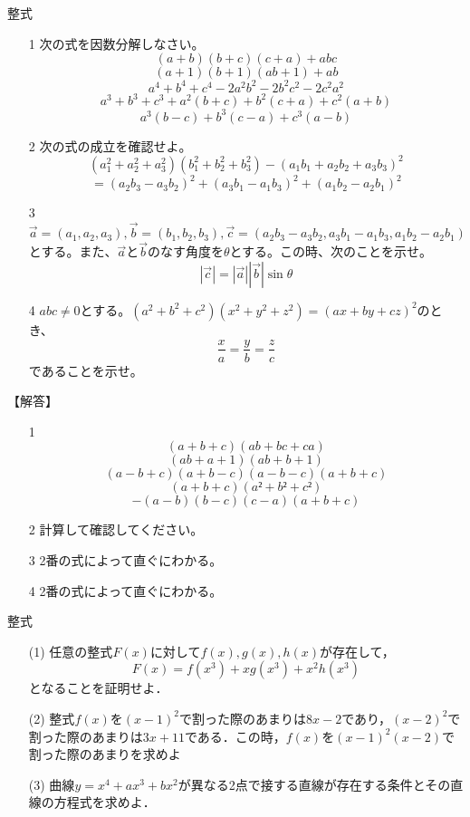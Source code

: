 \documentclass[a4paper,fleqn,dvipdfmx]{jsarticle}
\begin{document}
\newpage
\begin{itembox}[l]{整式}
    \begin{itemize}
        \item [1]
        次の式を因数分解しなさい。
        $$(a+b)(b+c)(c+a)+abc$$
        $$(a+1)(b+1)(ab+1)+ab$$
        $$a^4+b^4+c^4-2a^2b^2-2b^2c^2-2c^2a^2$$
        $$a^3+b^3+c^3+a^2(b+c)+b^2(c+a)+c^2(a+b)$$
        $$a^3(b-c)+b^3(c-a)+c^3(a-b)$$
        \item [2]
        次の式の成立を確認せよ。
        $$(a_1^2+a_2^2+a_3^2)(b_1^2+b_2^2+b_3^2)-(a_1b_1+a_2b_2+a_3b_3)^2$$
        $$=(a_2b_3-a_3b_2)^2+(a_3b_1-a_1b_3)^2+(a_1b_2-a_2b_1)^2$$
        \item [3] 
        $\overrightarrow{a}=(a_1,a_2,a_3),\overrightarrow{b}=(b_1,b_2,b_3),\overrightarrow{c}=(a_2b_3-a_3b_2,a_3b_1-a_1b_3,a_1b_2-a_2b_1)$とする。また、$\overrightarrow{a}$と$\overrightarrow{b}$のなす角度を$\theta$とする。この時、次のことを示せ。
        $$|\overrightarrow{c}|=|\overrightarrow{a}||\overrightarrow{b}|\sin\theta$$
        \item [4]
        $abc\neq 0$とする。$(a^2+b^2+c^2)(x^2+y^2+z^2)=(ax+by+cz)^2$のとき、$$\frac{x}{a}=\frac{y}{b}=\frac{z}{c}$$
        であることを示せ。
    \end{itemize}
\end{itembox}

\begin{flushleft}
【解答】\dotfill
\end{flushleft}

\begin{itemize}
    \item [1]$$(a+b+c)(ab+bc+ca)$$
    $$(ab+a+1)(ab+b+1)$$
    $$(a-b+c)(a+b-c)(a-b-c)(a+b+c)$$
    $$(a+b+c)(a²+b²+c²)$$
    $$-(a-b)(b-c)(c-a)(a+b+c)$$    
    \item [2]計算して確認してください。
    \item [3]2番の式によって直ぐにわかる。
    \item [4]2番の式によって直ぐにわかる。
\end{itemize}
\dotfill

\newpage
\begin{itembox}[l]{整式}
\begin{itemize}
    \item [(1)] 
    任意の整式$F(x)$に対して$f(x),g(x),h(x)$が存在して，    $$F(x)=f(x^3)+xg(x^3)+x^2h(x^3)$$    となることを証明せよ．
    \item[(2)]
    整式$f(x)$を$(x-1)^2$で割った際のあまりは$8x-2$であり，$(x-2)^2$で割った際のあまりは$3x+11$である．この時，$f(x)$を$(x-1)^2(x-2)$で割った際のあまりを求めよ
    \item[(3)]
    曲線$y=x^4+ax^3+bx^2$が異なる2点で接する直線が存在する条件とその直線の方程式を求めよ．
\end{itemize}
\end{itembox}
\end{document}
